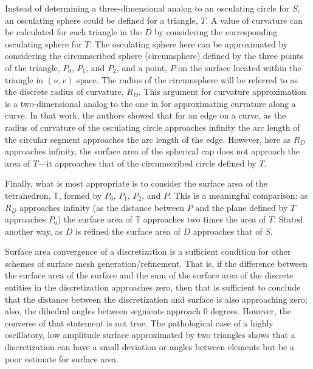 Instead of determining a three-dimensional analog to an osculating
circle for $S$, an osculating sphere could be defined for a triangle,
$T$. A value of curvature can be calculated for each triangle in the $D$
by considering the corresponding osculating sphere for $T$. The
osculating sphere here can be approximated by considering the
circumscribed sphere (circumsphere) \cite{casey1888} defined by the
three points of the triangle, $P_0$, $P_1$, and $P_2$, and a point, $P$
on the surface located within the triangle in $(u,v)$ space. The radius
of the circumsphere will be referred to as the discrete radius of
curvature, $R_D$. This argument for curvature approximation is a
two-dimensional analog to the one in \cite{mclaurin12} for approximating
curvature along a curve. In that work, the authors showed that for an
edge on a curve, as the radius of curvature of the osculating circle
approaches infinity the arc length of the circular segment approaches
the arc length of the edge.  However, here as $R_D$ approaches infinity,
the surface area of the spherical cap does not approach the area of
$T$---it approaches that of the circumscribed circle defined by $T$.

Finally, what is most appropriate is to consider the surface area of the
tetrahedron, ${\mathbb T}$, formed by $P_0$, $P_1$, $P_2$, and $P$. This
is a meaningful comparison: as $R_D$ approaches infinity (as the
distance between $P$ and the plane defined by $T$ approaches $P_0$) the
surface area of ${\mathbb T}$ approaches two times the area of $T$.
Stated another way, as $D$ is refined the surface area of $D$ approaches
that of $S$.

Surface area convergence of a discretization is a sufficient condition
for other schemes of surface mesh generation/refinement. That is, if the
difference between the surface area of the surface and the sum of the
surface area of the discrete entities in the discretization approaches
zero, then that is sufficient to conclude that the distance between the
discretization and surface is also approaching zero; also, the dihedral
angles between segments approach $0$ degrees. However, the converse of
that statement is not true. The pathological case of a highly
oscillatory, low amplitude surface approximated by two triangles shows
that a discretization can have a small deviation or angles between
elements but be a poor estimate for surface area.
